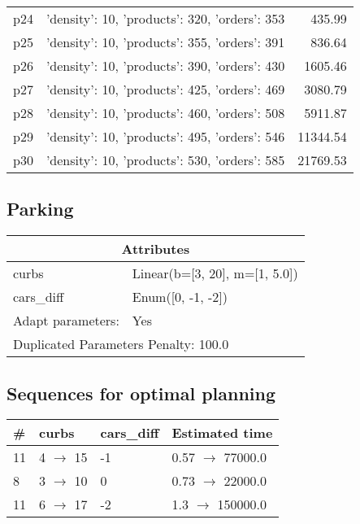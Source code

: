 \documentclass{article}
\begin{document}
\begin{center}
\begin{tabular}{@{}l|r|r@{}}
  p24&{'density': 10, 'products': 320, 'orders': 353}&435.99\\
  p25&{'density': 10, 'products': 355, 'orders': 391}&836.64\\
  p26&{'density': 10, 'products': 390, 'orders': 430}&1605.46\\
  p27&{'density': 10, 'products': 425, 'orders': 469}&3080.79\\
  p28&{'density': 10, 'products': 460, 'orders': 508}&5911.87\\
  p29&{'density': 10, 'products': 495, 'orders': 546}&11344.54\\
  p30&{'density': 10, 'products': 530, 'orders': 585}&21769.53
                            \end{tabular}
                            \end{center}
                    
                            \newpage \subsection{Parking}
                    \begin{center}
                    \begin{tabular}{@{}p{}p{}@{}}
                    \multicolumn{2}{c}{\bf \large Attributes}\\\midrule
                    curbs & Linear(b=[3, 20], m=[1, 5.0])\\
cars\_diff & Enum([0, -1, -2])
                    \\\midrule
                    Adapt parameters: & Yes \\\midrule
                    \multicolumn{2}{l}{Duplicated Parameters Penalty: 100.0}
                    \end{tabular}
                    \end{center}
                
                            \subsection*{Sequences for optimal planning}

                            \begin{center}
                            \begin{tabular}{@{}l|l|l|l@{}}
                            \# & curbs & cars\_diff & Estimated time\\\midrule
                            11&4 $\rightarrow$ 15&-1&0.57 $\rightarrow$ 77000.0\\
8&3 $\rightarrow$ 10&0&0.73 $\rightarrow$ 22000.0\\
11&6 $\rightarrow$ 17&-2&1.3 $\rightarrow$ 150000.0
                            \end{tabular}
                            \end{center}
                    
\end{document}
